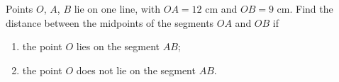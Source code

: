 Points $O$, $A$, $B$ lie on one line, with $OA=12$ cm and $OB=9$ cm. Find the distance between the midpoints of the segments $OA$ and $OB$ if
\begin{enumerate}
\item[(a)] the point $O$ lies on the segment $AB$;
\item[(b)] the point $O$ does not lie on the segment $AB$.
\end{enumerate}
